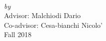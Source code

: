 \begin{titlepage}
  \vspace*{5cm}
  \makeatletter
  \begin{center}
    \begin{Huge}
      \@title
    \end{Huge}\\[0.1cm]
    \emph{by}\\
    \@author
    \vfill
    Advisor: Malchiodi Dario \\
    Co-advisor: Cesa-bianchi Nicolo' \\
    Fall 2018
  \end{center}
  \makeatother
\end{titlepage}

\newpage
\null
\thispagestyle{empty}
\newpage
